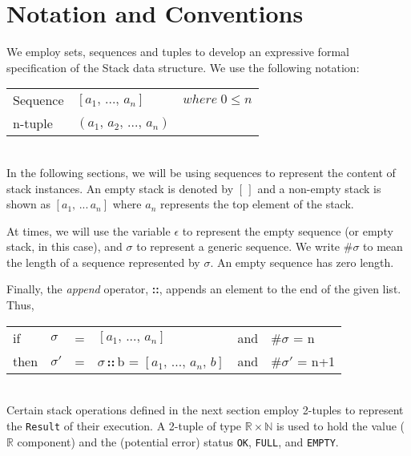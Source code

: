 \documentclass[10pt]{article}
\begin{document}
\section{Notation and Conventions}
We employ sets, sequences and tuples to develop an expressive formal specification of the Stack data structure. We use the following notation:\vspace*{6pt}\\
\noindent\hspace*{32pt}\begin{tabular}{lll}
  Sequence & $[a_1, \, ..., \, a_n]$ & $where \; 0 \leq n$\vspace*{2pt}\\
  n-tuple & $(a_1, \, a_2, \, ...,\, a_n)$\\
\end{tabular}\vspace*{4pt}\\

In the following sections, we will be using sequences to represent the content of stack instances. An empty stack is denoted by $[\,]$ and a non-empty stack is shown as $[a_1, \,...\, a_n]$ where $a_n$ represents the top element of the stack. 

At times, we will use the variable $\epsilon$ to represent the empty sequence (or empty stack, in this case), and $\sigma$ to represent a generic sequence. We write \#$\sigma$ to mean the length of a sequence represented by $\sigma$. An empty sequence has zero length.

Finally, the \emph{append} operator, \textbf{::}, appends an element to the end of the given list. Thus,\vspace*{6pt}\\
\noindent\hspace*{32pt}\begin{tabular}{llllll}
    if &$\sigma$ & = & $[a_1, \,...,\, a_n]$  \;\;\; & and \;\; &\#$\sigma$ = n\vspace*{4pt}\\
    then &$\sigma'$ & = & $\sigma$\,\textbf{::}\,b = $[a_1, \,...,\, a_n,\,b]$ & and & \#$\sigma'$ = n+1\\
\end{tabular}\vspace*{4pt}\\

Certain stack operations defined in the next section employ 2-tuples to represent the \texttt{Result} of their execution. A 2-tuple of type $\mathbb{R} \times \mathbb{N}$ is used to hold the value ($\mathbb{R}$ component) and the (potential error) status \texttt{OK}, \texttt{FULL}, and \texttt{EMPTY}. 
\end{document}
